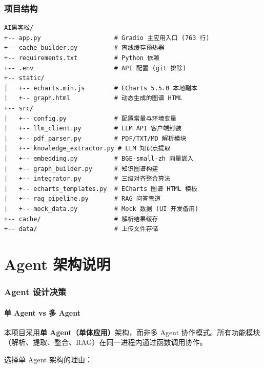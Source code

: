 \documentclass[12pt,a4paper]{article}
\begin{document}
\section{项目结构}
\label{sec:project-structure}

\begin{lstlisting}[language={}, title={项目文件结构}]
AI黑客松/
+-- app.py                    # Gradio 主应用入口 (763 行)
+-- cache_builder.py          # 离线缓存预热器
+-- requirements.txt          # Python 依赖
+-- .env                      # API 配置 (git 排除)
+-- static/
|   +-- echarts.min.js        # ECharts 5.5.0 本地副本
|   +-- graph.html            # 动态生成的图谱 HTML
+-- src/
|   +-- config.py             # 配置常量与环境变量
|   +-- llm_client.py         # LLM API 客户端封装
|   +-- pdf_parser.py         # PDF/TXT/MD 解析模块
|   +-- knowledge_extractor.py # LLM 知识点提取
|   +-- embedding.py          # BGE-small-zh 向量嵌入
|   +-- graph_builder.py      # 知识图谱构建
|   +-- integrator.py         # 三级对齐整合算法
|   +-- echarts_templates.py  # ECharts 图谱 HTML 模板
|   +-- rag_pipeline.py       # RAG 问答管道
|   +-- mock_data.py          # Mock 数据 (UI 开发备用)
+-- cache/                    # 解析结果缓存
+-- data/                     # 上传文件存储
\end{lstlisting}


\newpage
\part{Agent 架构说明}

\section{Agent 设计决策}
\label{sec:agent-design}

\subsection{单 Agent vs 多 Agent}

\begin{infobox}
本项目采用\textbf{单 Agent（单体应用）}架构，而非多 Agent 协作模式。所有功能模块（解析、提取、整合、RAG）在同一进程内通过函数调用协作。
\end{infobox}

选择单 Agent 架构的理由：
\end{document}

